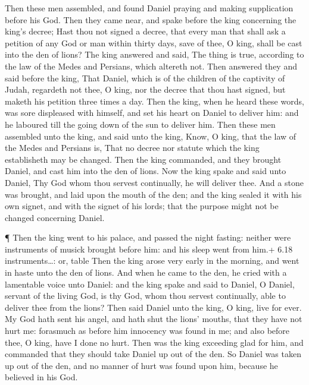  Then these men assembled, and found Daniel praying and
making supplication before his God.  Then they came near,
and spake before the king concerning the king's decree; Hast thou not
signed a decree, that every man that shall ask a petition of any God or
man within thirty days, save of thee, O king, shall be cast into the den
of lions? The king answered and said, The thing is true, according to
the law of the Medes and Persians, which altereth not. 
Then answered they and said before the king, That Daniel, which is of
the children of the captivity of Judah, regardeth not thee, O king, nor
the decree that thou hast signed, but maketh his petition three times a
day.  Then the king, when he heard these words, was sore
displeased with himself, and set his heart on Daniel to deliver him: and
he laboured till the going down of the sun to deliver him. 
Then these men assembled unto the king, and said unto the king, Know, O
king, that the law of the Medes and Persians is, That no decree nor
statute which the king establisheth may be changed.  Then
the king commanded, and they brought Daniel, and cast him into the den
of lions. Now the king spake and said unto Daniel, Thy God whom thou
servest continually, he will deliver thee.  And a stone was
brought, and laid upon the mouth of the den; and the king sealed it with
his own signet, and with the signet of his lords; that the purpose might
not be changed concerning Daniel.

 ¶ Then the king went to his palace, and passed the night
fasting: neither were instruments of musick brought before him: and his
sleep went from him.+ 6.18 instruments\ldots: or, table 
Then the king arose very early in the morning, and went in haste unto
the den of lions.  And when he came to the den, he cried
with a lamentable voice unto Daniel: and the king spake and said to
Daniel, O Daniel, servant of the living God, is thy God, whom thou
servest continually, able to deliver thee from the lions? 
Then said Daniel unto the king, O king, live for ever.  My
God hath sent his angel, and hath shut the lions' mouths, that they have
not hurt me: forasmuch as before him innocency was found in me; and also
before thee, O king, have I done no hurt.  Then was the
king exceeding glad for him, and commanded that they should take Daniel
up out of the den. So Daniel was taken up out of the den, and no manner
of hurt was found upon him, because he believed in his God.

